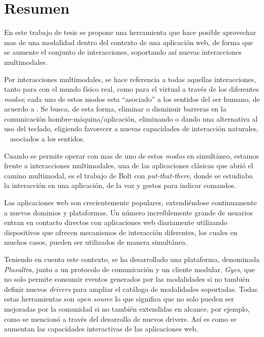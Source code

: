 

\begingroup
\let\clearpage\relax
\let\cleardoublepage\relax
\let\cleardoublepage\relax

\chapter*{Resumen} %
En este trabajo de tesis se propone una herramienta que hace posible aprovechar mas de una modalidad dentro del contexto de una aplicación web, de forma que se aumente el conjunto de interacciones, soportando así nuevas interacciones multimodales.

Por interacciones multimodales, se hace referencia a todas aquellas interacciones, tanto para con el mundo físico real, como para el virtual a través de los diferentes \emph{modos}; cada uno de estos modos esta ``asociado'' a los sentidos del ser humano, de acuerdo a \citet{Bourguet2003}. Se busca, de esta forma, eliminar o disminuir barreras en la comunicación hombre-máquina/aplicación, \eg eliminando o dando una alternativa al uso del teclado, eligiendo favorecer a nuevas capacidades de interacción naturales, \ie~ asociados a los sentidos.

Cuando se permite operar con mas de uno de estos \emph{modos} en simultáneo, estamos frente a interacciones multimodales, una de las aplicaciones clásicas que abrió el camino multimodal, es el trabajo de Bolt \citep{bolt1980put} con \emph{put-that-there}, donde se estudiaba la interacción en una aplicación, de la voz y gestos para indicar comandos.

Las aplicaciones web son crecientemente populares, extendiéndose continuamente a nuevos dominios y plataformas. Un número increíblemente grande de usuarios entran en contacto directos con aplicaciones web diariamente utilizando dispositivos que ofrecen mecanismos de interacción diferentes, los cuales en muchos casos, pueden ser utilizados de manera simultánea.

Teniendo en cuenta este contexto, se ha desarrollado una plataforma, denominada \emph{Plusultra}, junto a un protocolo de comunicación y un cliente modular, \emph{Gyes}, que no solo permite consumir eventos generados por las modalidades si no también definir nuevos \emph{drivers} para ampliar el catálogo de modalidades soportadas. Todas estas herramientas son \emph{open source} lo que significa que no solo pueden ser mejoradas por la comunidad si no también extendidas en alcance, por ejemplo, como se mencionó a través del desarrollo de nuevos drivers. Así es como se aumentan las capacidades interactivas de las aplicaciones web.

